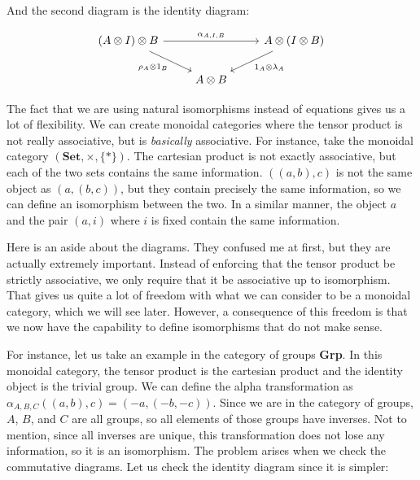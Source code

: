 \documentclass{article}
\begin{document}
And the second diagram is the identity diagram:

\begin{equation*}
  \begin{tikzcd}
    (A \otimes I) \otimes B \arrow[rr, "{\alpha_{A, I, B}}"] \arrow[rd, "\rho_A \otimes 1_B"'] &             & A \otimes (I \otimes B) \arrow[ld, "1_A \otimes \lambda_A"] \\
                                                                                               & A \otimes B &
  \end{tikzcd}
\end{equation*}

The fact that we are using natural isomorphisms instead of equations gives us a
lot of flexibility. We can create monoidal categories where the tensor product
is not really associative, but is \textit{basically} associative. For instance,
take the monoidal category $(\textbf{Set}, \times, \{*\})$. The cartesian
product is not exactly associative, but each of the two sets contains the same
information. $((a, b), c)$ is not the same object as $(a, (b, c))$, but they
contain precisely the same information, so we can define an isomorphism between
the two. In a similar manner, the object $a$ and the pair $(a, i)$ where $i$ is
fixed contain the same information.

Here is an aside about the diagrams. They confused me at first, but they are
actually extremely important. Instead of enforcing that the tensor product be
strictly associative, we only require that it be associative up to isomorphism.
That gives us quite a lot of freedom with what we can consider to be a monoidal
category, which we will see later. However, a consequence of this freedom is
that we now have the capability to define isomorphisms that do not make sense.

For instance, let us take an example in the category of groups \textbf{Grp}. In
this monoidal category, the tensor product is the cartesian product and the
identity object is the trivial group. We can define the alpha transformation as
$\alpha_{A, B, C}((a, b), c) = (-a, (-b, -c))$. Since we are in the category of
groups, $A$, $B$, and $C$ are all groups, so all elements of those groups have
inverses. Not to mention, since all inverses are unique, this transformation
does not lose any information, so it is an isomorphism. The problem arises when
we check the commutative diagrams. Let us check the identity diagram since it
is simpler:
\end{document}
